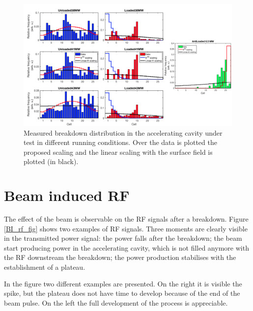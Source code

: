 \begin{landscape}

\begin{figure}[h]
\centering 
\includegraphics[scale=0.53]{pictures/distro_all.png}
\caption{Measured breakdown distribution in the accelerating cavity under test in different running conditions. Over the data is plotted the proposed scaling and the linear scaling with the surface field is plotted (in black).}
\label{BD_distro}
\end{figure}
 
\end{landscape}





\section[Beam induced RF]{Beam induced RF}

The effect of the beam is observable on the RF signals after a breakdown. Figure \ref{BI_rf_fig}  shows two examples of RF signals. Three moments are clearly visible in the transmitted power signal: the power falls after the breakdown; the beam start producing power in the accelerating cavity, which is not filled anymore with the RF downstream the breakdown; the power production stabilises with the establishment of a plateau. 

In the figure two different examples are presented. On the right it is visible the spike, but the plateau does not have time to develop because of the end of the beam pulse. On the left the full development of the process is appreciable.

